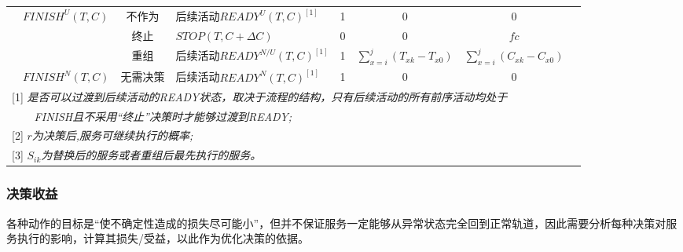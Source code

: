 \begin{table}[htbp]
\begin{lrbox}{\tablebox}
\begin{tabular}{llllllll}
        \multicolumn{1}{|c|}{} 
        & \multirow{3}{*}{$FINISH^U(T,C)$} 
        & \multicolumn{1}{|c}{不作为} 
        & \multicolumn{1}{|l}{后续活动$READY^U(T,C)^{[1]}$} 
        & \multicolumn{1}{|c}{1} 
        & \multicolumn{1}{|c}{0} 
        & \multicolumn{1}{|c|}{0} \\
        \cline{3-7}

        \multicolumn{1}{|c|}{} 
        &       
        & \multicolumn{1}{|c}{终止} 
        & \multicolumn{1}{|l}{$STOP(T,C+\Delta C)$} 
        & \multicolumn{1}{|c}{0} 
        & \multicolumn{1}{|c}{0} 
        & \multicolumn{1}{|c|}{$fc$} \\
        \cline{3-7}

        \multicolumn{1}{|c|}{} 
        &       
        & \multicolumn{1}{|c}{重组} 
        & \multicolumn{1}{|l}{后续活动$READY^{N/U}(T,C)^[1]$} 
        & \multicolumn{1}{|c}{1} 
        & \multicolumn{1}{|c}{$\sum\limits_{x = i}^j {({T_{xk}} - {T_{x0}})} $} 
        & \multicolumn{1}{|c|}{$\sum\limits_{x = i}^j {({C_{xk}} - {C_{x0}})} $}  \\
        \cline{2-7}

        \multicolumn{1}{|c|}{} 
        & $FINISH^N(T,C)$
        & \multicolumn{1}{|c}{无需决策} 
        & \multicolumn{1}{|l}{后续活动$READY^N(T,C)^[1]$} 
        & \multicolumn{1}{|c}{1} 
        & \multicolumn{1}{|c}{0} 
        & \multicolumn{1}{|c|}{0} \\
        \bottomrule
        
        \multicolumn{7}{l}{[1] \textit{是否可以过渡到后续活动的READY状态，取决于流程的结构，只有后续活动的所有前序活动均处于}}  \\
        \multicolumn{7}{l}{\textit{~~~~FINISH且不采用“终止”决策时才能够过渡到READY;}} \\
        \multicolumn{7}{l}{[2] \textit{$r$为决策后,服务可继续执行的概率; }}  \\
        \multicolumn{7}{l}{[3] \textit{$S_{ik}$为替换后的服务或者重组后最先执行的服务。 }}  \\
    \end{tabular}%
\end{lrbox}
\end{table}%




\subsubsection{决策收益} \label{sec:reward_section}
各种动作的目标是“使不确定性造成的损失尽可能小”，但并不保证服务一定能够从异常状态完全回到正常轨道，因此需要分析每种决策对服务执行的影响，计算其损失/受益，以此作为优化决策的依据。

